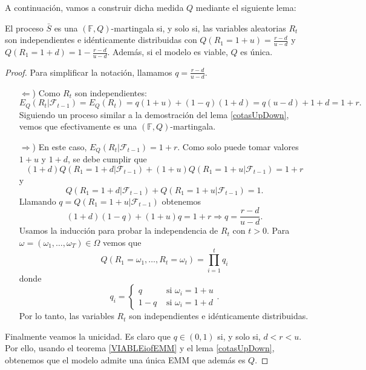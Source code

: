 A continuación, vamos a construir dicha medida $ Q $ mediante el siguiente lema:
\begin{lemaBox}\label{cotasUpDown}
El proceso $ \bar{S} $ es una $ (\mathbb{F},Q) $-martingala si, y solo si, las variables aleatorias $ R_t $ son independientes e idénticamente distribuidas con $ Q(R_1 = 1+u) = \frac{r-d}{u-d}$ y $ Q(R_1 = 1+d) = 1- \frac{r-d}{u-d} $. Además, si el modelo es viable, $ Q $ es única.
\end{lemaBox} 
\begin{proof}
Para simplificar la notación, llamamos $ q =  \frac{r-d}{u-d}$.
\begin{itemize}
\item[$ \Longleftarrow $)] Como $ R_t $ son independientes:
\[
E_Q(R_t | \mathcal{F}_{t-1}) = E_Q(R_t) = q(1+u) + (1-q)(1+d) = q(u-d) + 1 +d = 1+r.
\]
Siguiendo un proceso similar a la demostración del lema \ref{cotasUpDown}, vemos que efectivamente es una $ (\mathbb{F},Q) $-martingala.
\item[$ \Longrightarrow $)] En este caso, $ E_Q(R_t | \mathcal{F}_{t-1}) = 1+r $. Como solo puede tomar valores $ 1+u $ y $ 1+d $, se debe cumplir que
\[
(1+d)Q(R_1 = 1+d | \mathcal{F}_{t-1}) + (1+u)Q(R_1 = 1+u | \mathcal{F}_{t-1}) = 1+r
\]
y
\[
Q(R_1 = 1+d | \mathcal{F}_{t-1}) + Q(R_1 = 1+u | \mathcal{F}_{t-1}) = 1.
\]
Llamando $ q =  Q(R_1 = 1+u | \mathcal{F}_{t-1})$ obtenemos
\[
(1+d)(1-q) + (1+u)q = 1+r \Longrightarrow q = \frac{r-d}{u-d}.
\]
Usamos la inducción para probar la independencia de $ R_t $ con $ t >0 $. Para $ \omega = (\omega_1,\dots,\omega_T) \in \Omega $ vemos que
\[
Q(R_1 = \omega_1,\dots,R_t = \omega_t) = \prod_{i=1}^{t}q_i
\]
donde
\[
q_i =  \begin{cases}
q & \text{ si } \omega_i = 1+u\\
1-q& \text{ si } \omega_i = 1+d
\end{cases}.
\]
Por lo tanto, las variables $ R_t $ son independientes e idénticamente distribuidas.
\end{itemize}

Finalmente veamos la unicidad. Es claro que $ q \in (0,1) $ si, y solo si, $ d<r<u $. Por ello, usando el teorema \ref{VIABLEiofEMM} y el lema \ref{cotasUpDown}, obtenemos que el modelo admite una única EMM que además es $ Q $.
\end{proof}

